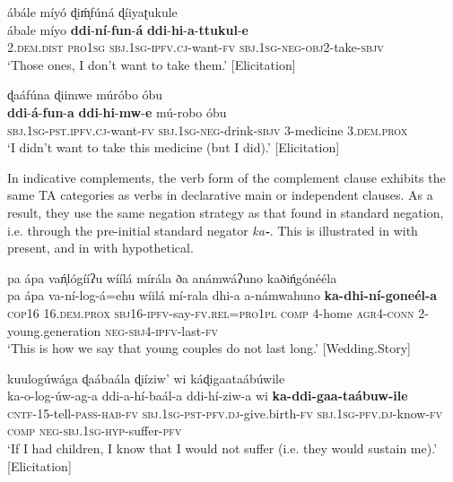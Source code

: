 \documentclass[output=paper,colorlinks=true, citecolor=brown,draftmode]{langscibook}
\begin{document}
\ea\label{ex:cuw:37}
    \ea\label{ex:cuw:37a} ábále míyó ɖiḿ̩fúná ɖíiyaʈukule \\
        \gll  ábale míyo \textbf{ddi}{}-\textbf{ní}{}-\textbf{fun}{}-\textbf{á} \textbf{ddi}{}-\textbf{hi}{}-\textbf{a}{}-\textbf{ttukul}{}-\textbf{e}  \\
             2.\textsc{dem.dist} \textsc{pro1sg} \textsc{sbj.1sg-ipfv.cj-}want-\textsc{fv} \textsc{sbj.1sg-neg-obj2-}take-\textsc{sbjv} \\
        \glt ‘Those ones, I don’t want to take them.’ [Elicitation]

    \ex\label{ex:cuw:37b} ɖaáfúna ɖiimwe múróbo óbu\\
        \gll \textbf{ddi}{}-\textbf{á}{}-\textbf{fun}{}-\textbf{a} \textbf{ddi}{}-\textbf{hi}{}-\textbf{mw}{}-\textbf{e} mú-robo óbu  \\
             \textsc{sbj.1sg-pst.ipfv.cj-}want-\textsc{fv} \textsc{sbj.1sg-neg-}drink-\textsc{sbjv} 3-medicine 3.\textsc{dem.prox}  \\
        \glt ‘I didn’t want to take this medicine (but I did).’ [Elicitation]
    \z
\z 

In indicative complements, the verb form of the complement clause exhibits the same TA categories as verbs in declarative main or independent clauses. As a result, they use the same negation strategy as that found in standard negation, i.e. through the pre-initial standard negator \textit{ka}\textbf{\textit{{}-}}. This is illustrated in  with present, and in  with hypothetical.

{
\ea\label{ex:cuw:38}
    \ea\label{ex:cuw:38a} pa ápa vań̩lógííʔu wíílá mírála ða anámwáʔuno kaðiń̩gónééla\\ 
        \gll  pa ápa va-ní-log-á=ehu wíilá mí-rala dhi-a a-námwahuno \textbf{ka-dhi-ní-goneél-a} \\
             \textsc{cop16} \textsc{16.dem.prox} \textsc{sbj16-ipfv-}say-\textsc{fv.rel=pro1pl} \textsc{comp} 4-home \textsc{agr}4-\textsc{conn} \textsc{2-}young.generation \textsc{neg-sbj4-ipfv-}last-\textsc{fv} \\
        \glt ‘This is how we say that young couples do not last long.’ [Wedding.Story]

    \ex\label{ex:cuw:38b} kuulogúwága ɖaábaála ɖiíziw’ wi káɖigaataábúwile \\
        \gll  ka-o-log-úw-ag-a ddi-a-hí-baál-a ddi-hí-ziw-a wi \textbf{ka-ddi-gaa-taábuw-ile} \\
             \textsc{cntf-15-}tell-\textsc{pass-hab-fv} \textsc{sbj.1sg-pst-pfv.dj-}give.birth-\textsc{fv} \textsc{sbj.1sg-pfv.dj}{}-know-\textsc{fv} \textsc{comp} \textsc{neg-sbj.1sg-hyp}{}-suffer-\textsc{pfv} \\
        \glt ‘If I had children, I know that I would not suffer (i.e. they would sustain me).’ [Elicitation]
    \z
\z }
\end{document}
